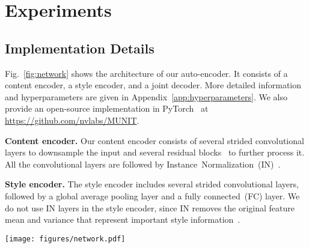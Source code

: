 \documentclass[runningheads]{llncs}
\newcommand{\vpara}[1]{\vspace{0.05in}\noindent\textbf{#1}}
\begin{document}
	\section{Experiments}
	\label{sec:experiments}	
	\subsection{Implementation Details}
	\label{sec:implementation}
	Fig.~\ref{fig:network} shows the architecture of our auto-encoder. It consists of a content encoder, a style encoder, and a joint decoder.
	More detailed information and hyperparameters are given in Appendix~\ref{app:hyperparameters}. We also provide an open-source implementation in PyTorch~\cite{paszke2017automatic} at \href{https://github.com/nvlabs/MUNIT}{https://github.com/nvlabs/MUNIT}.
	
	\vpara{Content encoder.} Our content encoder consists of several strided convolutional layers to downsample the input and several residual blocks~\cite{he2016deep} to further process it. All the convolutional layers are followed by \mbox{Instance Normalization~(IN)~\cite{ulyanov2017improved}.}


	\vpara{Style encoder.} The style encoder includes several strided convolutional layers, followed by a global average pooling layer and a fully connected~(FC) layer. We do not use IN layers in the style encoder, since IN removes the original feature mean and variance that represent important style information~\cite{huang2017adain}.

	
	\begin{figure*}[!tb]
		\centering
		\texttt{[image: figures/network.pdf]}
\caption{Our auto-encoder architecture. The content encoder consists of several strided convolutional layers followed by residual blocks. The style encoder contains several strided convolutional layers followed by a global average pooling layer and a fully connected layer. The decoder uses a MLP to produce a set of AdaIN~\cite{huang2017adain} parameters from the style code. The content code is then processed by residual blocks with AdaIN layers, and finally decoded to the image space by upsampling and convolutional layers.} 		
		\label{fig:network}
\end{figure*}
	
\end{document}
